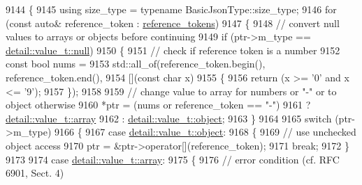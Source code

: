 \begin{DoxyCode}
9144     \{
9145         \textcolor{keyword}{using} size\_type = \textcolor{keyword}{typename} BasicJsonType::size\_type;
9146         \textcolor{keywordflow}{for} (\textcolor{keyword}{const} \textcolor{keyword}{auto}& reference\_token : \hyperlink{classnlohmann_1_1json__pointer_a07a990a6838de4f38ee9d881e7b9fd61}{reference\_tokens})
9147         \{
9148             \textcolor{comment}{// convert null values to arrays or objects before continuing}
9149             \textcolor{keywordflow}{if} (ptr->m\_type == \hyperlink{namespacenlohmann_1_1detail_a1ed8fc6239da25abcaf681d30ace4985a37a6259cc0c1dae299a7866489dff0bd}{detail::value\_t::null})
9150             \{
9151                 \textcolor{comment}{// check if reference token is a number}
9152                 \textcolor{keyword}{const} \textcolor{keywordtype}{bool} nums =
9153                     std::all\_of(reference\_token.begin(), reference\_token.end(),
9154                                 [](\textcolor{keyword}{const} \textcolor{keywordtype}{char} x)
9155                 \{
9156                     \textcolor{keywordflow}{return} (x >= \textcolor{charliteral}{'0'} and x <= \textcolor{charliteral}{'9'});
9157                 \});
9158 
9159                 \textcolor{comment}{// change value to array for numbers or "-" or to object otherwise}
9160                 *ptr = (nums or reference\_token == \textcolor{stringliteral}{"-"})
9161                        ? \hyperlink{namespacenlohmann_1_1detail_a1ed8fc6239da25abcaf681d30ace4985af1f713c9e000f5d3f280adbd124df4f5}{detail::value\_t::array}
9162                        : \hyperlink{namespacenlohmann_1_1detail_a1ed8fc6239da25abcaf681d30ace4985aa8cfde6331bd59eb2ac96f8911c4b666}{detail::value\_t::object};
9163             \}
9164 
9165             \textcolor{keywordflow}{switch} (ptr->m\_type)
9166             \{
9167                 \textcolor{keywordflow}{case} \hyperlink{namespacenlohmann_1_1detail_a1ed8fc6239da25abcaf681d30ace4985aa8cfde6331bd59eb2ac96f8911c4b666}{detail::value\_t::object}:
9168                 \{
9169                     \textcolor{comment}{// use unchecked object access}
9170                     ptr = &ptr->operator[](reference\_token);
9171                     \textcolor{keywordflow}{break};
9172                 \}
9173 
9174                 \textcolor{keywordflow}{case} \hyperlink{namespacenlohmann_1_1detail_a1ed8fc6239da25abcaf681d30ace4985af1f713c9e000f5d3f280adbd124df4f5}{detail::value\_t::array}:
9175                 \{
9176                     \textcolor{comment}{// error condition (cf. RFC 6901, Sect. 4)}

\end{DoxyCode}
